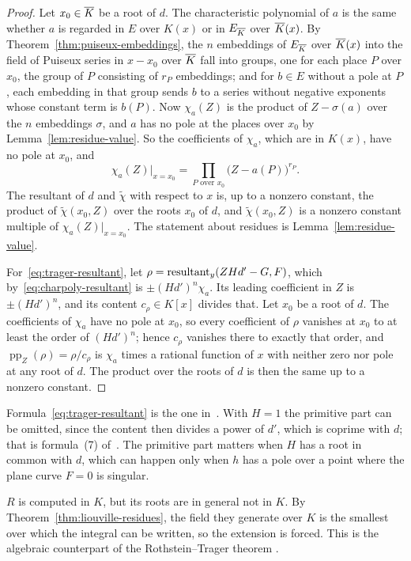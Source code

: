 \begin{proof}
Let $x_0 \in \overline{K}$ be a root of $d$. The characteristic polynomial of $a$ is the same whether $a$ is regarded in
$E$ over $K(x)$ or in $E_{\overline{K}}$ over $\overline{K}(x)$. By
Theorem~\ref{thm:puiseux-embeddings}, the $n$ embeddings of $E_{\overline{K}}$ over
$\overline{K}(x)$ into the field of Puiseux series in $x - x_0$ over $\overline{K}$ fall
into groups,
one for each place $P$ over $x_0$, the group of $P$ consisting of $r_P$
embeddings; and for $b \in E$ without a pole at $P$, each embedding in that
group sends $b$ to a series without negative exponents whose constant term is
$b(P)$. Now $\chi_a(Z)$ is the product of $Z - \sigma(a)$ over the $n$
embeddings $\sigma$, and $a$ has no pole at the places over $x_0$ by
Lemma~\ref{lem:residue-value}. So the coefficients of $\chi_a$, which are in
$K(x)$, have no pole at $x_0$, and
\[
  \chi_a(Z)\big|_{x = x_0} = \prod_{P \text{ over } x_0} \bigl( Z - a(P) \bigr)^{r_P} .
\]
The resultant of $d$ and $\tilde\chi$ with respect to $x$ is, up to a nonzero
constant, the product of $\tilde\chi(x_0, Z)$ over the roots $x_0$ of $d$, and
$\tilde\chi(x_0, Z)$ is a nonzero constant multiple of $\chi_a(Z)|_{x = x_0}$.
The statement about residues is Lemma~\ref{lem:residue-value}.

For~\eqref{eq:trager-resultant}, let $\rho = \operatorname{resultant}_y(Z H d' - G, F)$,
which by~\eqref{eq:charpoly-resultant} is $\pm (H d')^n \chi_a$. Its leading
coefficient in $Z$ is $\pm (H d')^n$, and its content $c_\rho \in K[x]$ divides
that. Let $x_0$ be a root of $d$. The coefficients of $\chi_a$ have no pole
at $x_0$, so every coefficient of $\rho$ vanishes at $x_0$ to at least the
order of $(H d')^n$; hence $c_\rho$ vanishes there to exactly that order, and
$\operatorname{pp}_Z(\rho) = \rho / c_\rho$ is $\chi_a$ times a rational function
of $x$ with neither zero nor pole at any root of $d$. The product over the
roots of $d$ is then the same up to a nonzero constant.
\end{proof}

Formula~\eqref{eq:trager-resultant} is the one
in~\cite[\S2.5]{bronstein1998tutorial}. With $H = 1$ the primitive part can
be omitted, since the content then divides a power of $d'$, which is coprime
with $d$; that is formula~(7) of~\cite[\S5.2]{trager1984}. The primitive part matters when $H$ has a root
in common with $d$, which can happen only when $h$ has a pole over a point
where the plane curve $F = 0$ is singular.

$R$ is computed in $K$, but its roots are in general not in $K$. By
Theorem~\ref{thm:liouville-residues}, the field they generate over $K$ is
the smallest over which the integral can be written, so the extension is
forced. This is the algebraic counterpart of the Rothstein--Trager theorem
.


